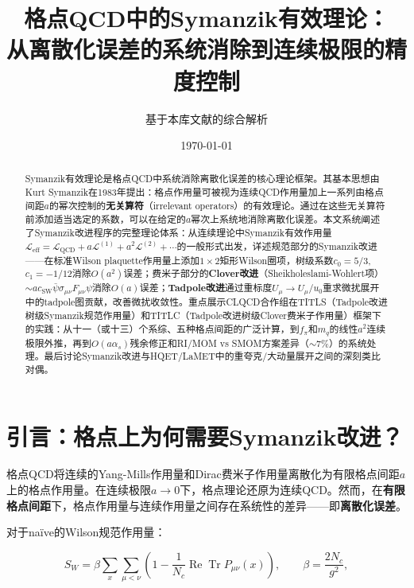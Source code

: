 \documentclass[12pt,a4paper]{ctexart}
\title{\heiti 格点QCD中的Symanzik有效理论：\\
从离散化误差的系统消除到连续极限的精度控制}
\author{基于本库文献的综合解析}
\date{\today}
\theoremstyle{definition}
\begin{document}
\maketitle

\begin{abstract}
\noindent
Symanzik有效理论是格点QCD中系统消除离散化误差的核心理论框架。其基本思想由Kurt Symanzik在1983年提出：格点作用量可被视为连续QCD作用量加上一系列由格点间距$a$的幂次控制的\textbf{无关算符}（irrelevant operators）的有效理论。通过在这些无关算符前添加适当选定的系数，可以在给定的$a$幂次上系统地消除离散化误差。本文系统阐述了Symanzik改进程序的完整理论体系：从连续理论中Symanzik有效作用量$\mathcal{L}_{\text{eff}} = \mathcal{L}_{\text{QCD}} + a\mathcal{L}^{(1)} + a^2\mathcal{L}^{(2)} + \cdots$的一般形式出发，详述规范部分的Symanzik改进——在标准Wilson plaquette作用量上添加$1\times2$矩形Wilson圈项，树级系数$c_0 = 5/3$, $c_1 = -1/12$消除$O(a^2)$误差；费米子部分的\textbf{Clover改进}（Sheikholeslami-Wohlert项）$\sim a c_{\text{SW}} \bar{\psi}\sigma_{\mu\nu}F_{\mu\nu}\psi$消除$O(a)$误差；\textbf{Tadpole改进}通过重标度$U_\mu \to U_\mu/u_0$重求微扰展开中的tadpole图贡献，改善微扰收敛性。重点展示CLQCD合作组在TITLS（Tadpole改进树级Symanzik规范作用量）和TITLC（Tadpole改进树级Clover费米子作用量）框架下的实践：从十一（或十三）个系综、五种格点间距的广泛计算，到$f_\pi$和$m_q$的线性$a^2$连续极限外推，再到$O(a\alpha_s)$残余修正和RI/MOM vs SMOM方案差异（$\sim7\%$）的系统处理。最后讨论Symanzik改进与HQET/LaMET中的重夸克/大动量展开之间的深刻类比对偶。
\end{abstract}

\tableofcontents
\newpage

\section{引言：格点上为何需要Symanzik改进？}

格点QCD将连续的Yang-Mills作用量和Dirac费米子作用量离散化为有限格点间距$a$上的格点作用量。在连续极限$a \to 0$下，格点理论还原为连续QCD。然而，在\textbf{有限格点间距}下，格点作用量与连续作用量之间存在系统性的差异——即\textbf{离散化误差}。

对于na\"ive的Wilson规范作用量\cite{CLQCD2025quark_mass,Chen2025gluon}：

\begin{equation}
S_W = \beta \sum_x \sum_{\mu<\nu} \left(1 - \frac{1}{N_c}\operatorname{Re}\operatorname{Tr} P_{\mu\nu}(x)\right), \qquad \beta = \frac{2N_c}{g^2},
\end{equation}
\end{document}
